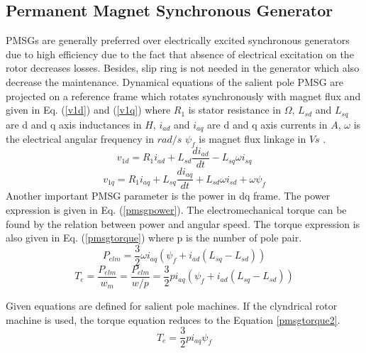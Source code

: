 \subsection{Permanent Magnet Synchronous Generator}
\label{pmsgsection}
PMSGs are generally preferred over electrically excited synchronous generators due to high efficiency due to the fact that absence of electrical excitation on the rotor decreases losses. Besides, slip ring is not needed in the generator which also decrease the maintenance. Dynamical equations of the salient pole PMSG are projected on a reference frame which rotates synchronously with magnet flux and given in Eq. (\ref{v1d}) and (\ref{v1q}) where $R_{1}$ is stator resistance in $\Omega$, $L_{sd}$ and $L_{sq}$ are d and q axis inductances in $H$, $i_{ad}$ and $i_{aq}$ are d and q axis currents in $A$, $\omega$ is the electrical angular frequency in $rad/s$ $\psi_{f}$ is magnet flux linkage in $Vs$ \cite{Ackermann2005a}. 
\begin{equation}
v_{1d}=R_{1} i_{ad}+L_{sd}\frac{di_{ad}}{dt}-L_{sq}\omega i_{sq}
\label{v1d}
\end{equation}
\begin{equation}
v_{1q}=R_{1} i_{aq}+L_{sq}\frac{di_{aq}}{dt}+L_{sd}\omega i_{sd}+\omega \psi_{f}
\label{v1q}
\end{equation}
Another important PMSG parameter is the power in dq frame. The power expression is given in Eq. (\ref{pmsgpower}). The electromechanical torque can be found by the relation between power and angular speed. The torque expression is also given in Eq. (\ref{pmsgtorque}) where p is the number of pole pair.
\begin{equation}
P_{elm}=\frac{3}{2}\omega i_{aq} (\psi_{f}+i_{ad}(L_{sq}-L_{sd}))
\label{pmsgpower}
\end{equation}
\begin{equation}
T_{e}=\frac{P_{elm}}{w_{m}}=\frac{P_{elm}}{w/p}=\frac{3}{2}p i_{aq} (\psi_{f}+i_{ad}(L_{sq}-L_{sd}))
\label{pmsgtorque}
\end{equation}

Given equations are defined for salient pole machines. If the clyndrical rotor machine is used, the torque equation reduces to the Equation \ref{pmsgtorque2}.
\begin{equation}
T_{e}=\frac{3}{2}p i_{aq} \psi_{f}
\label{pmsgtorque2}
\end{equation}

